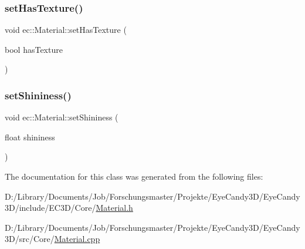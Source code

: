 \mbox{\label{classec_1_1_material_a135ee01e9b085d0d78468e47b76bd17a}} 
\subsubsection{\texorpdfstring{set\+Has\+Texture()}{setHasTexture()}}
{\footnotesize\ttfamily void ec\+::\+Material\+::set\+Has\+Texture (\begin{DoxyParamCaption}\item[{bool}]{has\+Texture }\end{DoxyParamCaption})}

\mbox{\label{classec_1_1_material_a4b9efb15466a547d4579566dfb1e558f}} 
\subsubsection{\texorpdfstring{set\+Shininess()}{setShininess()}}
{\footnotesize\ttfamily void ec\+::\+Material\+::set\+Shininess (\begin{DoxyParamCaption}\item[{float}]{shininess }\end{DoxyParamCaption})}



The documentation for this class was generated from the following files\+:\begin{DoxyCompactItemize}
\item 
D\+:/\+Library/\+Documents/\+Job/\+Forschungsmaster/\+Projekte/\+Eye\+Candy3\+D/\+Eye\+Candy3\+D/include/\+E\+C3\+D/\+Core/\mbox{\hyperlink{_material_8h}{Material.\+h}}\item 
D\+:/\+Library/\+Documents/\+Job/\+Forschungsmaster/\+Projekte/\+Eye\+Candy3\+D/\+Eye\+Candy3\+D/src/\+Core/\mbox{\hyperlink{_material_8cpp}{Material.\+cpp}}\end{DoxyCompactItemize}
